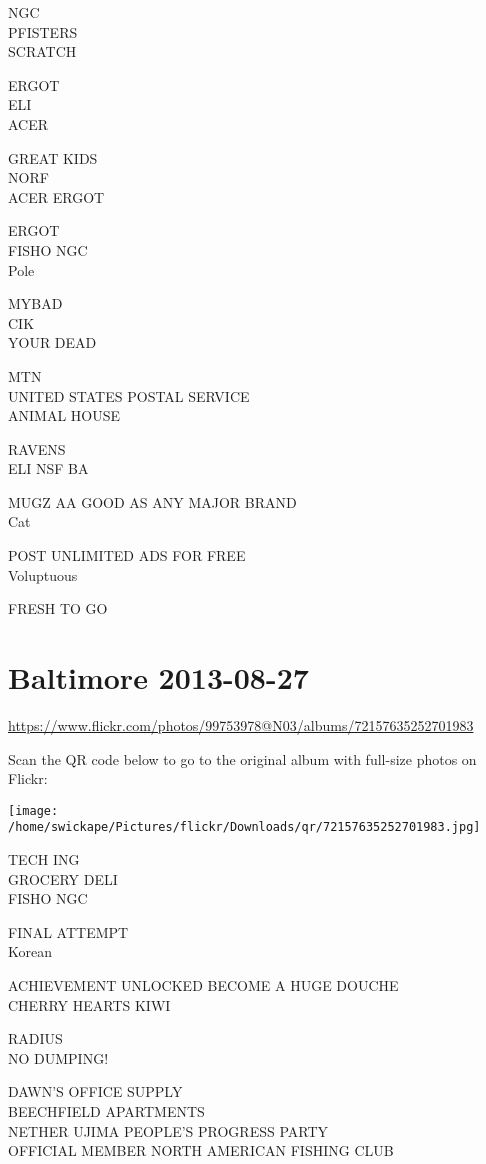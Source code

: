 \documentclass[10pt,letterpaper]{article}
\begin{document}
NGC\\
PFISTERS\\
SCRATCH

ERGOT\\
ELI\\
ACER

GREAT KIDS\\
NORF\\
ACER ERGOT

ERGOT\\
FISHO NGC\\
Pole

MYBAD\\
CIK\\
YOUR DEAD

MTN\\
UNITED STATES POSTAL SERVICE\\
ANIMAL HOUSE

RAVENS\\
ELI NSF BA

MUGZ AA GOOD AS ANY MAJOR BRAND\\
Cat

POST UNLIMITED ADS FOR FREE\\
Voluptuous

FRESH TO GO
\pagebreak

\section*{Baltimore 2013-08-27}

\url{https://www.flickr.com/photos/99753978@N03/albums/72157635252701983}

Scan the QR code below to go to the original album with full-size photos on Flickr:

\texttt{[image: /home/swickape/Pictures/flickr/Downloads/qr/72157635252701983.jpg]}
\pagebreak

TECH ING\\
GROCERY DELI\\
FISHO NGC

FINAL ATTEMPT\\
Korean

ACHIEVEMENT UNLOCKED BECOME A HUGE DOUCHE\\
CHERRY HEARTS KIWI

RADIUS\\
NO DUMPING!

DAWN'S OFFICE SUPPLY\\
BEECHFIELD APARTMENTS\\
NETHER UJIMA PEOPLE'S PROGRESS PARTY\\
OFFICIAL MEMBER NORTH AMERICAN FISHING CLUB
\end{document}

